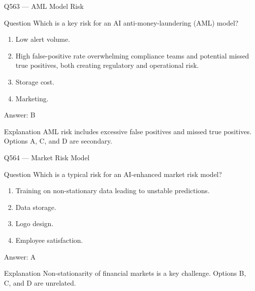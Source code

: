 \documentclass[aspectratio=169,8pt]{beamer}
\begin{document}
	\begin{frame}{Q563 --- AML Model Risk}
		\begin{block}{Question}
			Which is a key risk for an AI anti-money-laundering (AML) model?
			\begin{enumerate}
				\item Low alert volume.
				\item High false-positive rate overwhelming compliance teams and potential missed true positives, both creating regulatory and operational risk.
				\item Storage cost.
				\item Marketing.
			\end{enumerate}
		\end{block}
		\begin{exampleblock}{Answer: B}\end{exampleblock}
		\begin{block}{Explanation}
			AML risk includes excessive false positives and missed true positives. Options A, C, and D are secondary.
		\end{block}
	\end{frame}
	
	\begin{frame}{Q564 --- Market Risk Model}
		\begin{block}{Question}
			Which is a typical risk for an AI-enhanced market risk model?
			\begin{enumerate}
				\item Training on non-stationary data leading to unstable predictions.
				\item Data storage.
				\item Logo design.
				\item Employee satisfaction.
			\end{enumerate}
		\end{block}
		\begin{exampleblock}{Answer: A}\end{exampleblock}
		\begin{block}{Explanation}
			Non-stationarity of financial markets is a key challenge. Options B, C, and D are unrelated.
		\end{block}
	\end{frame}
	
\end{document}
